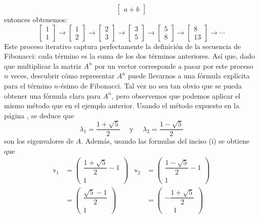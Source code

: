 \begin{example}
$$\begin{bmatrix}
        a + b
    \end{bmatrix}$$
    entonces obtenemos:
    $$\begin{bmatrix}
        1 \\
        1
    \end{bmatrix} \to \begin{bmatrix}
        1 \\
        2
    \end{bmatrix} \to \begin{bmatrix}
        2 \\
        3
    \end{bmatrix} \to \begin{bmatrix}
        3 \\
        5
    \end{bmatrix} \to \begin{bmatrix}
        5 \\
        8
    \end{bmatrix} \to \begin{bmatrix}
        8 \\
        13
    \end{bmatrix} \to \cdots$$
    Este proceso iterativo captura perfectamente la definición de la secuencia de Fibonacci: cada término es la suma de los dos términos anteriores. Así que, dado que multiplicar la matriz $A^n$ por un vector corresponde a pasar por este proceso $n$ veces, descubrir cómo representar $A^n$ puede llevarnos a una fórmula explícita para el término $n$-ésimo de Fibonacci. Tal vez no sea tan obvio que se pueda obtener una fórmula clara para $A^n$, pero observemos que podemos aplicar el mismo método que en el ejemplo anterior. Usando el método expuesto en la página \pageref{metodo_eigen_2x2}, se deduce que
    $$\lambda_1 = \frac{1 + \sqrt{5}}{2} \quad \text{ y } \quad \lambda_2 = \frac{1 - \sqrt{5}}{2}$$
    son los eigenvalores de $A$. Además, usando las formulas del inciso (i) se obtiene que
    \begin{align*}
        \mathbb{v}_1 & = \begin{pmatrix} \dfrac{1 + \sqrt{5}}{2} - 1 \\[3mm] 1 \end{pmatrix} & \mathbb{v}_2 & = \begin{pmatrix} \dfrac{1 - \sqrt{5}}{2} - 1 \\[3mm] 1 \end{pmatrix} \\
        & = \begin{pmatrix} \dfrac{\sqrt{5} - 1}{2} \\[3mm] 1 \end{pmatrix} & & = \begin{pmatrix} -\dfrac{1 + \sqrt{5}}{2} \\[3mm] \phantom{-} 1 \end{pmatrix}

\end{align*}
\end{example}
